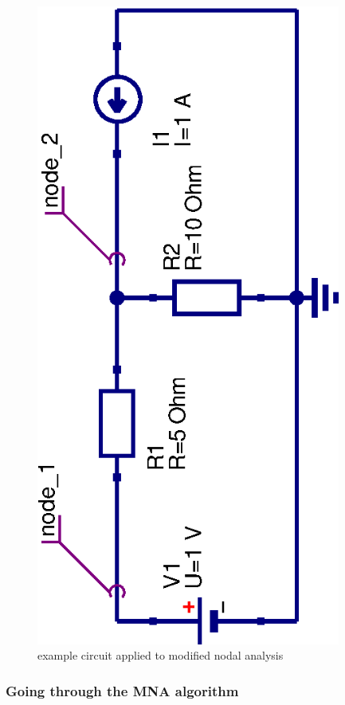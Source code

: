 \begin{figure}[ht]
\begin{center}
\includegraphics[angle=-90,width=10cm]{MNAexample}
\end{center}
\caption{example circuit applied to modified nodal analysis}
\label{fig:MNAexample}
\end{figure}
\FloatBarrier

\subsubsection{Going through the MNA algorithm}

